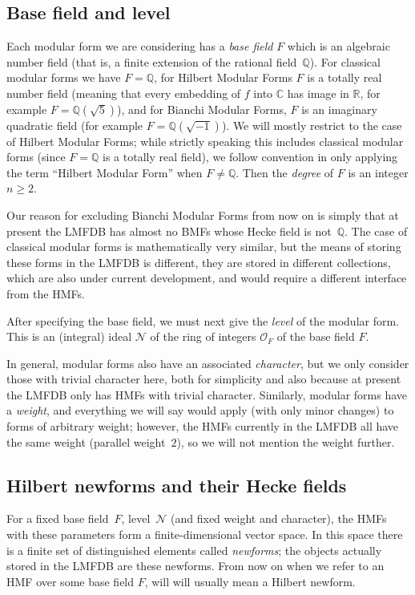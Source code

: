 \documentclass{llncs}
\def\Q{{\mathbb Q}}
\def\R{{\mathbb R}}
\def\C{{\mathbb C}}
\def\N{{\mathcal{N}}}
\def\O{{\mathcal{O}}}
\begin{document}
\subsection{Base field and level}
Each modular form we are considering has a \emph{base field} $F$ which
is an algebraic number field (that is, a finite extension of the
rational field~$\Q$).  For classical modular forms we have $F=\Q$, for
Hilbert Modular Forms $F$ is a totally real number field (meaning that
every embedding of $f$ into $\C$ has image in $\R$, for example
$F=\Q(\sqrt{5})$), and for Bianchi Modular Forms, $F$ is an imaginary
quadratic field (for example $F=\Q(\sqrt{-1})$).  We will mostly
restrict to the case of Hilbert Modular Forms; while strictly speaking
this includes classical modular forms (since $F=\Q$ is a totally real
field), we follow convention in only applying the term ``Hilbert
Modular Form'' when $F\not=\Q$.  Then the \emph{degree} of $F$ is an
integer $n\ge2$.

Our reason for excluding Bianchi Modular Forms from now on is simply
that at present the LMFDB has almost no BMFs whose Hecke field is
not~$\Q$.  The case of classical modular forms is mathematically very
similar, but the means of storing these forms in the LMFDB is
different, they are stored in different collections, which are also
under current development, and would require a different interface
from the HMFs.

After specifying the base field, we must next give the \emph{level} of
the modular form.  This is an (integral) ideal $\N$ of the ring of
integers $\O_F$ of the base field $F$.

In general, modular forms also have an associated \emph{character},
but we only consider those with trivial character here, both for
simplicity and also because at present the LMFDB only has HMFs with
trivial character.  Similarly, modular forms have a \emph{weight}, and
everything we will say would apply (with only minor changes) to forms
of arbitrary weight; however, the HMFs currently in the LMFDB all have
the same weight (parallel weight~$2$), so we will not mention the
weight further.

\subsection{Hilbert newforms and their Hecke fields}
For a fixed base field~$F$, level~$\N$ (and fixed weight and
character), the HMFs with these parameters form a finite-dimensional
vector space.  In this space there is a finite set of distinguished
elements called \emph{newforms}; the objects actually stored in the
LMFDB are these newforms.  From now on when we refer to an HMF over
some base field $F$, will will usually mean a Hilbert newform.
\end{document}
